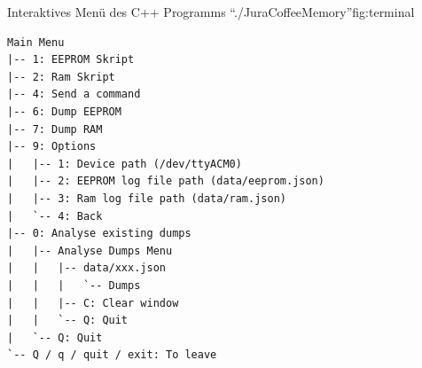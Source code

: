 {  \hfill%
}{Interaktives Menü des C++ Programms "`./JuraCoffeeMemory"'}{fig:terminal}

\begin{lstlisting}[label=lst:menu-tree,caption={Menü-Baum ./JuraCoffeeMemory}]
Main Menu
|-- 1: EEPROM Skript
|-- 2: Ram Skript
|-- 4: Send a command
|-- 6: Dump EEPROM
|-- 7: Dump RAM
|-- 9: Options
|   |-- 1: Device path (/dev/ttyACM0)
|   |-- 2: EEPROM log file path (data/eeprom.json)
|   |-- 3: Ram log file path (data/ram.json)
|   `-- 4: Back
|-- 0: Analyse existing dumps
|   |-- Analyse Dumps Menu
|   |   |-- data/xxx.json
|   |   |   `-- Dumps
|   |   |-- C: Clear window
|   |   `-- Q: Quit
|   `-- Q: Quit
`-- Q / q / quit / exit: To leave
\end{lstlisting}

